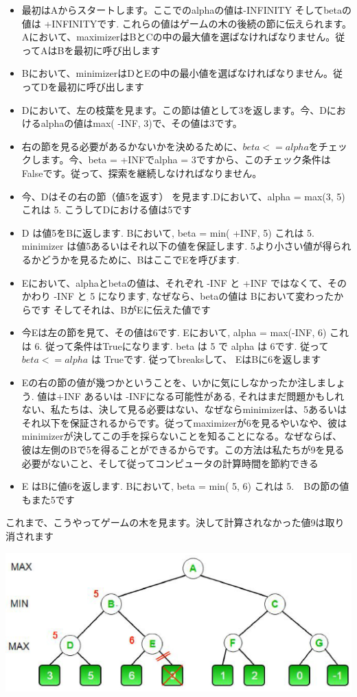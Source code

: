 \documentclass[uplatex,a4paper,11pt,oneside,openany]{jsbook}
\begin{document}
\begin{itemize}
  \item 最初はAからスタートします。ここでのalphaの値は-INFINITY そしてbetaの値は +INFINITYです. これらの値はゲームの木の後続の節に伝えられます。
  Aにおいて、maximizerはBとCの中の最大値を選ばなければなりません。従ってAはBを最初に呼び出します
  \item Bにおいて、minimizerはDとEの中の最小値を選ばなければなりません。従ってDを最初に呼び出します
  \item Dにおいて、左の枝葉を見ます。この節は値として3を返します。今、Dにおけるalphaの値はmax( -INF, 3)で、その値は3です。
  \item 右の節を見る必要があるかないかを決めるために、$beta<=alpha$をチェックします。今、beta = +INFでalpha = 3ですから、このチェック条件はFalseです。従って、探索を継続しなければなりません。
  \item 今、Dはその右の節（値5を返す） を見ます.Dにおいて、alpha = max(3, 5) これは 5. こうしてDにおける値は5です
  \item D は値5をBに返します. Bにおいて, beta = min( +INF, 5) これは 5. minimizer は値5あるいはそれ以下の値を保証します.
  5より小さい値が得られるかどうかを見るために、BはここでEを呼びます.
  \item Eにおいて、alphaとbetaの値は、それぞれ -INF と +INF ではなくて、そのかわり -INF と 5 になります, なぜなら、betaの値は Bにおいて変わったからです そしてそれは、BがEに伝えた値です
  \item 今Eは左の節を見て、その値は6です. Eにおいて, alpha = max(-INF, 6) これは 6. 従って条件はTrueになります. beta は 5 で alpha は 6です. 従って$beta<=alpha$ は Trueです. 従ってbreaksして、 EはBに6を返します
  \item Eの右の節の値が幾つかということを、いかに気にしなかったか注しましょう. 値は+INF あるいは -INFになる可能性がある, それはまだ問題かもしれない、私たちは、決して見る必要はない、なぜならminimizerは、5あるいはそれ以下を保証されるからです。従ってmaximizerが6を見るやいなや、彼はminimizerが決してこの手を採らないことを知ることになる。なぜならば、彼は左側のBで5を得ることができるからです。この方法は私たちが9を見る必要がないこと、そして従ってコンピュータの計算時間を節約できる
  \item E はBに値6を返します. Bにおいて, beta = min( 5, 6) これは 5.　Bの節の値もまた5です
\end{itemize}

これまで、こうやってゲームの木を見ます。決して計算されなかった値9は取り消されます

\begin{center}
  \includegraphics[width=0.8\hsize]{figures/eps/MIN_MAX2.eps}
\end{center}
\end{document}
